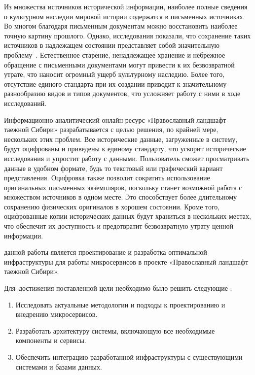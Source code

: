     {\actuality} Из множества источников исторической информации, наиболее полные сведения о культурном наследии мировой
    истории содержатся в письменных источниках.
    Во многом благодаря письменным документам можно восстановить наиболее точную картину прошлого.
    Однако, исследования показали, что сохранение таких источников в надлежащем состоянии представляет собой значительную проблему~\cite{болдовская2023историческая}.
    Естественное старение, ненадлежащее хранение и небрежное обращение с письменными документами могут привести к их безвозвратной утрате, что наносит огромный ущерб культурному наследию.
    Более того, отсутствие единого стандарта при их создании приводит к значительному разнообразию видов и типов документов, что усложняет работу с ними в ходе исследований.

    Информационно-аналитический онлайн-ресурс «Православный ландшафт таежной Сибири» разрабатывается с целью решения,
    по крайней мере, нескольких этих проблем.
    Все исторические данные, загруженные в систему, будут оцифрованы и приведены к единому стандарту, что ускорит исторические
    исследования и упростит работу с данными.
    Пользователь сможет просматривать данные в удобном формате, будь то текстовый или графический вариант представления.
    Оцифровка также позволит сократить использование оригинальных письменных экземпляров, поскольку станет возможной
    работа с множеством источников в одном месте.
    Это способствует более длительному сохранению физических оригиналов в хорошем состоянии.
    Кроме того, оцифрованные копии исторических данных будут храниться в нескольких местах, что обеспечит их доступность и предотвратит безвозвратную утрату ценной информации.

        {\aim} данной работы является проектирование и разработка оптимальной инфраструктуры для работы
    микросервисов в проекте «Православный ландшафт таежной Сибири».

    Для~достижения поставленной цели необходимо было решить следующие {\tasks}:
    \begin{enumerate}[beginpenalty=10000] %
        \item Исследовать актуальные методологии и подходы к проектированию и внедрению микросервисов.
        \item Разработать архитектуру системы, включающую все необходимые компоненты и сервисы.
        \item Обеспечить интеграцию разработанной инфраструктуры с существующими системами и базами данных.
    \end{enumerate}
